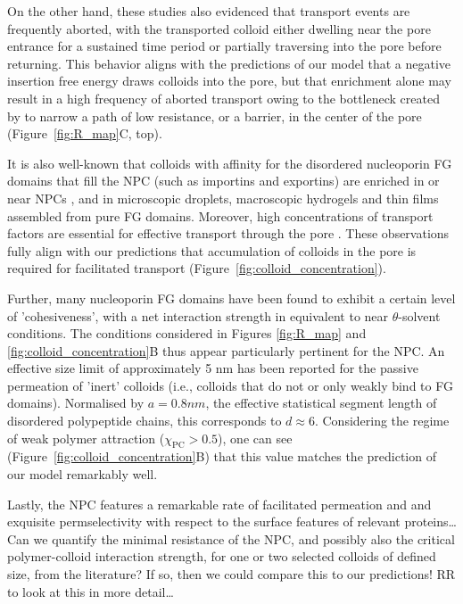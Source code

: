 \documentclass[12pt, a4paper]{article}
\begin{document}
On the other hand, these studies also evidenced that transport events are frequently aborted, with the transported colloid either dwelling near the pore entrance for a sustained time period or partially traversing into the pore before returning.
This behavior aligns with the predictions of our model that a negative insertion free energy draws colloids into the pore, but that enrichment alone may result in a high frequency of aborted transport owing to the bottleneck created by to narrow a path of low resistance, or a barrier, in the center of the pore (Figure~\ref{fig:R_map}C, top).

It is also well-known that colloids with affinity for the disordered nucleoporin FG domains that fill the NPC (such as importins and exportins) are enriched in or near NPCs \cite{Beck2007, Gruenwald2010, Tu2011}, and in microscopic droplets, macroscopic hydrogels and thin films assembled from pure FG domains.
Moreover, high concentrations of transport factors are essential for effective transport through the pore \cite{Lowe2019}.
These observations fully align with our predictions that accumulation of colloids in the pore is required for facilitated transport (Figure~\ref{fig:colloid_concentration}).

Further, many nucleoporin FG domains have been found to exhibit a certain level of 'cohesiveness', with a net interaction strength in equivalent to near $\theta$-solvent conditions.
The conditions considered in Figures \ref{fig:R_map} and \ref{fig:colloid_concentration}B thus appear particularly pertinent for the NPC.
An effective size limit of approximately 5 nm has been reported for the passive permeation of 'inert' colloids (i.e., colloids that do not or only weakly bind to FG domains).
Normalised by $a = 0.8 nm$, the effective statistical segment length of disordered polypeptide chains, this corresponds to $d \approx 6$. Considering the regime of weak polymer attraction ($\chi_{\text{PC}} > 0.5$), one can see (Figure~\ref{fig:colloid_concentration}B) that this value matches the prediction of our model remarkably well.

Lastly, the NPC features a remarkable rate of facilitated permeation and and exquisite permselectivity with respect to the surface features of relevant proteins\dots
Can we quantify the minimal resistance of the NPC, and possibly also the critical polymer-colloid interaction strength, for one or two selected colloids of defined size, from the literature? If so, then we could compare this to our predictions! RR to look at this in more detail\dots
\end{document}
